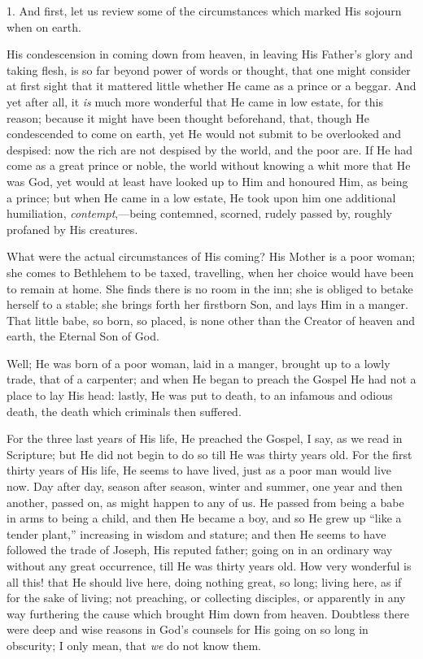 1. And first, let us review some of the circumstances which marked
His sojourn when on earth.

His condescension in coming down from heaven, in leaving His Father's
glory and taking flesh, is so far beyond power of words or thought,
that one might consider at first sight that it mattered little whether
He came as a prince or a beggar. And yet after all, it \emph{is} much
more wonderful that He came in low estate, for this reason; because it
might have been thought beforehand, that, though He condescended to
come on earth, yet He would not submit to be overlooked and despised:
now the rich are not despised by the world, and the poor are. If He
had come as a great prince or noble, the world without knowing a whit
more that He was God, yet would at least have looked up to Him and
honoured Him, as being a prince; but when He came in a low estate, He
took upon him one additional humiliation, \emph{contempt},—being
contemned, scorned, rudely passed by, roughly profaned by His
creatures.

What were the actual circumstances of His coming? His Mother is a
poor woman; she comes to Bethlehem to be taxed, travelling, when her
choice would have been to remain at home. She finds there is no room
in the inn; she is obliged to betake herself to a stable; she brings
forth her firstborn Son, and lays Him in a manger. That little babe,
so born, so placed, is none other than the Creator of heaven and
earth, the Eternal Son of God.

Well; He was born of a poor woman, laid in a manger, brought up to
a lowly trade, that of a carpenter; and when He began to preach the
Gospel He had not a place to lay His head: lastly, He was put to
death, to an infamous and odious death, the death which criminals then
suffered.

For the three last years of His life, He preached the Gospel, I
say, as we read in Scripture; but He did not begin to do so till He
was thirty years old. For the first thirty years of His life, He seems
to have lived, just as a poor man would live now. Day after day,
season after season, winter and summer, one year and then another,
passed on, as might happen to any of us. He passed from being a babe
in arms to being a child, and then He became a boy, and so He grew up
``like a tender plant,'' increasing in wisdom and stature; and
then He seems to have followed the trade of Joseph, His reputed
father; going on in an ordinary way without any great occurrence, till
He was thirty years old. How very wonderful is all this! that He
should live here, doing nothing great, so long; living here, as if for
the sake of living; not preaching, or collecting disciples, or
apparently in any way furthering the cause which brought Him down from
heaven. Doubtless there were deep and wise reasons in God's counsels
for His going on so long in obscurity; I only mean, that \emph{we} do
not know them.

